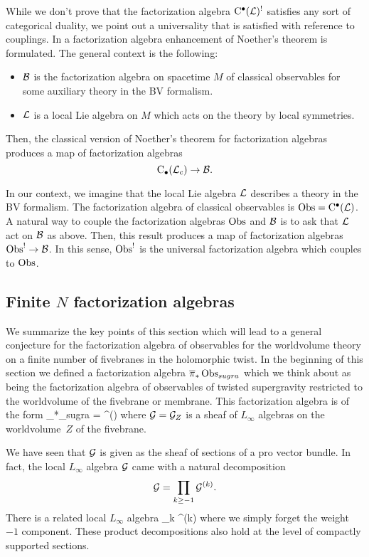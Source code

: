 While we don't prove that the factorization algebra ${\rm C}^\bullet(\mathcal L)^!$ satisfies any sort of categorical duality, we point out a universality that is satisfied with reference to couplings.
In \cite[Part 3]{CG2} a factorization algebra enhancement of Noether's theorem is formulated. 
The general context is the following: 
\begin{itemize}
\item $\mathcal B$ is the factorization algebra on spacetime $M$ of classical observables for some auxiliary theory in the BV formalism.
\item $\mathcal L$ is a local Lie algebra on $M$ which acts on the theory by local symmetries. 
\end{itemize}
Then, the classical version of Noether's theorem for factorization algebras produces a map of factorization algebras 
\[
{\rm C}_\bullet(\mathcal L_c) \to \mathcal B .
\]

In our context, we imagine that the local Lie algebra $\mathcal L$ describes a theory in the BV formalism.
The factorization algebra of classical observables is $\operatorname{Obs} = {\rm C}^\bullet(\mathcal L)$. 
A natural way to couple the factorization algebras $\operatorname{Obs}$ and $\mathcal B$ is to ask that $\mathcal L$ act on $\mathcal B$ as above.
Then, this result produces a map of factorization algebras $\operatorname{Obs}^! \to \mathcal B$.
In this sense, $\operatorname{Obs}^!$ is the universal factorization algebra which couples to $\operatorname{Obs}$.

\subsection{Finite $N$ factorization algebras}
\label{sec:factsummary}

We summarize the key points of this section which will lead to a general conjecture for the factorization algebra of observables for the worldvolume theory on a finite number of fivebranes in the holomorphic twist.
In the beginning of this section we defined a factorization algebra $\overline{\pi}_*\operatorname{Obs}_{sugra}$ which we think about as being the factorization algebra of observables of twisted supergravity restricted to the worldvolume of the fivebrane or membrane.
This factorization algebra is of the form 
\beqn
\label{eqn:factgrad}
\Bar{\pi}_*\Obs_{sugra} = \clie^\bu(\cG)
\eeqn
where $\mathcal G = \mathcal G_Z$ is a sheaf of $L_\infty$ algebras on the worldvolume~$Z$ of the fivebrane.

We have seen that $\mathcal G$ is given as the sheaf of sections of a pro vector bundle. 
In fact, the local $L_\infty$ algebra $\mathcal G$ came with a natural decomposition 
\[
\mathcal G = \prod_{k \geq -1} \mathcal G^{(k)} .
\]
There is a related local $L_\infty$ algebra 
\beqn
\til \cG {} \prod_{k } \cG^{(k)}
\eeqn
where we simply forget the weight $-1$ component. 
These product decompositions also hold at the level of compactly supported sections. 

